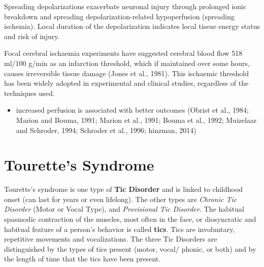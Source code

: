 Spreading depolarizations exacerbate neuronal injury through
prolonged ionic breakdown and spreading depolarization-related hypoperfusion
(spreading ischemia). Local duration of
the depolarization indicates local tissue energy status and risk of injury.

Focal cerebral ischaemia experiments have suggested cerebral blood flow 518
ml/100 g/min as an infarction threshold, which if maintained over some hours,
causes irreversible tissue damage (Jones et al., 1981). This ischaemic threshold
has been widely adopted in experimental and clinical studies, regardless of the
techniques used.

\begin{itemize}
  \item  increased perfusion is associated with better outcomes
(Obrist et al., 1984; Marion and Bouma, 1991; Marion
et al., 1991; Bouma et al., 1992; Muizelaar and Schroder, 1994;
Schroder et al., 1996; hinzman, 2014)


\end{itemize}


\section{Tourette's Syndrome}
\label{sec:Tourette-syndrome}


Tourette's syndrome is one type of {\bf Tic Disorder} and is linked to childhood
onset (can last for years or even lifelong). The other types are {\it Chronic
Tic Disorder} (Motor or Vocal Type), and {\it Provisional Tic Disorder}.
The habitual spasmodic contraction of the muscles, most often in the face, or
diosyncratic and habitual feature of a person's behavior is called {\bf tics}.
Tics are involuntary, repetitive movements and vocalizations.
The three Tic Disorders are distinguished by the types of tics present (motor,
vocal/ phonic, or both) and by the length of time that the tics have been
present.

